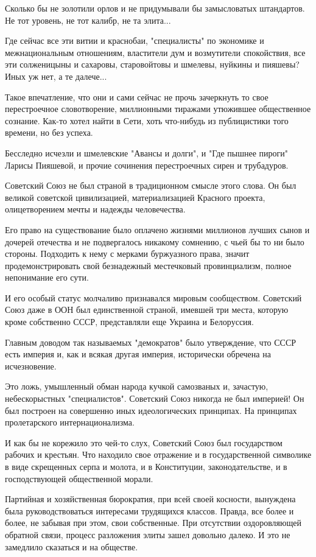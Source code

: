 \documentclass[a4paper,11pt]{extreport}
\begin{document}
Сколько бы не золотили орлов и не придумывали бы замысловатых штандартов. Не
тот уровень, не тот калибр, не та элита...

Где сейчас все эти витии и краснобаи, "специалисты" по экономике и
межнациональным отношениям, властители дум и возмутители спокойствия, все эти
солженицыны и сахаровы, старовойтовы и шмелевы, нуйкины и пияшевы? Иных уж нет,
а те далече...

Такое впечатление, что они и сами сейчас не прочь зачеркнуть то свое
перестроечное словотворение, миллионными тиражами утюжившее общественное
сознание. Как-то хотел найти в Сети, хоть что-нибудь из публицистики того
времени, но без успеха.

Бесследно исчезли и шмелевские "Авансы и долги", и "Где пышнее пироги" Ларисы
Пияшевой, и прочие сочинения перестроечных сирен и трубадуров.

Советский Союз не был страной в традиционном смысле этого слова. Он был великой
советской цивилизацией, материализацией Красного проекта, олицетворением мечты
и надежды человечества.

Его право на существование было оплачено жизнями миллионов лучших сынов и
дочерей отечества и не подвергалось никакому сомнению, с чьей бы то ни было
стороны. Подходить к нему с мерками буржуазного права, значит
продемонстрировать свой безнадежный местечковый провинциализм, полное
непонимание его сути.

И его особый статус молчаливо признавался мировым сообществом. Советский Союз
даже в ООН был единственной страной, имевшей три места, которую кроме
собственно СССР, представляли еще Украина и Белоруссия.

Главным доводом так называемых "демократов" было утверждение, что СССР есть
империя и, как и всякая другая империя, исторически обречена на исчезновение.

Это ложь, умышленный обман народа кучкой самозваных и, зачастую, небескорыстных
"специалистов". Советский Союз никогда не был империей! Он был построен на
совершенно иных идеологических принципах. На принципах пролетарского
интернационализма.

И как бы не корежило это чей-то слух, Советский Союз был государством рабочих и
крестьян.  Что находило свое отражение и в государственной символике в виде
скрещенных серпа и молота, и в Конституции, законодательстве, и в
господствующей общественной морали.

Партийная и хозяйственная бюрократия, при всей своей косности, вынуждена была
руководствоваться интересами трудящихся классов. Правда, все более и более, не
забывая при этом, свои собственные. При отсутствии оздоровляющей обратной
связи, процесс разложения элиты зашел довольно далеко. И это не замедлило
сказаться и на обществе.
\end{document}

